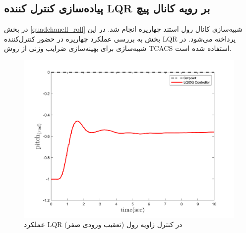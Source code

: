 \subsection{پیاده‌سازی کنترل کننده LQR بر رویه کانال پیچ}
در بخش
\ref{quadchanell_roll}
شبیه‌سازی کانال رول استند چهارپره انجام شد. در این بخش به بررسی عملکرد چهارپره در حضور کنترل‌کننده LQR پرداخته می‌شود. در شبیه‌سازی برای بهینه‌سازی ضرایب وزنی از روش
TCACS \cite{Karimi2010}
استفاده شده است.
\begin{figure}[H]\label{lqr_roll_fig}
	\includegraphics[width=12cm]{../Figures/Calibration/LQR/Pitch/lqr_pitch.png}
	\centering
	\caption{عملكرد LQR در کنترل زاويه رول (تعقیب ورودی صفر)}
\end{figure}

